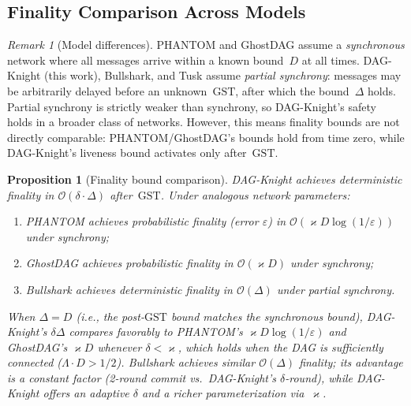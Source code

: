 \documentclass[11pt,a4paper]{article}
\newtheorem{proposition}[theorem]{Proposition}
\theoremstyle{definition}
\theoremstyle{remark}
\newtheorem{remark}[theorem]{Remark}
\newcommand{\DK}{\textsf{DAG-Knight}}
\newcommand{\GST}{\mathrm{GST}}
\renewcommand{\kappa}{\varkappa}
\newcommand{\bigO}{\mathcal{O}}
\begin{document}
\subsection{Finality Comparison Across Models}

\begin{remark}[Model differences]\label{rem:model-differences}
PHANTOM and GhostDAG assume a \emph{synchronous} network where all
messages arrive within a known bound~$D$ at all times.
\DK{} (this work), Bullshark, and Tusk assume \emph{partial synchrony}:
messages may be arbitrarily delayed before an unknown~$\GST$, after which
the bound~$\Delta$ holds.
Partial synchrony is strictly weaker than synchrony, so \DK{}'s safety
holds in a broader class of networks.
However, this means finality bounds are not directly comparable:
PHANTOM/GhostDAG's bounds hold from time zero, while \DK{}'s liveness
bound activates only after~$\GST$.
\end{remark}

\begin{proposition}[Finality bound comparison]\label{prop:finality-comparison}
\DK{} achieves deterministic finality in $\bigO(\delta \cdot \Delta)$
after~$\GST$.
Under analogous network parameters:
\begin{enumerate}[label=(\roman*)]
  \item PHANTOM achieves probabilistic finality (error $\varepsilon$) in
    $\bigO(\kappa D \log(1/\varepsilon))$ under synchrony;
  \item GhostDAG achieves probabilistic finality in $\bigO(\kappa D)$
    under synchrony;
  \item Bullshark achieves deterministic finality in $\bigO(\Delta)$
    under partial synchrony.
\end{enumerate}
When $\Delta = D$ (i.e., the post-$\GST$ bound matches the synchronous
bound), \DK{}'s $\delta \Delta$ compares favorably to PHANTOM's
$\kappa D \log(1/\varepsilon)$ and GhostDAG's $\kappa D$ whenever
$\delta < \kappa$, which holds when the DAG is sufficiently connected
($\Lambda \cdot D > 1/2$).
Bullshark achieves similar $\bigO(\Delta)$ finality; its advantage is a
constant factor (2-round commit vs.\ \DK{}'s $\delta$-round), while \DK{}
offers an adaptive $\delta$ and a richer parameterization via~$\kappa$.
\end{proposition}
\end{document}
